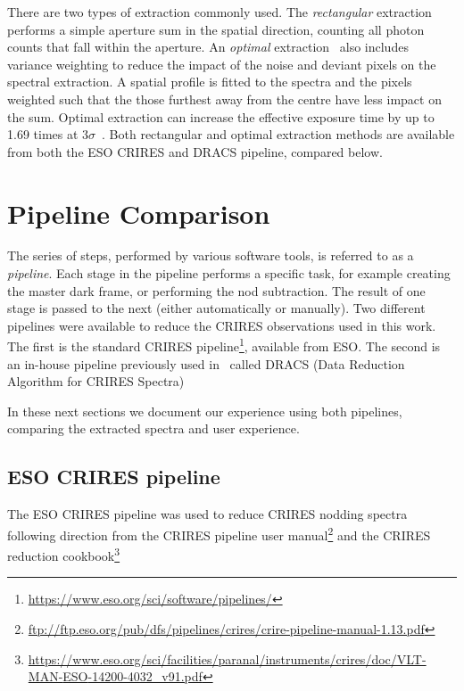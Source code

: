 There are two types of extraction commonly used. The \emph{rectangular} extraction performs a simple aperture sum in the spatial direction, counting all photon counts that fall within the aperture. An \emph{optimal} extraction~\citep{horne_optimal_1986} also includes variance weighting to reduce the impact of the noise and deviant pixels on the spectral extraction. A spatial profile is fitted to the spectra and the pixels weighted such that the those furthest away from the centre have less impact on the sum. Optimal extraction can increase the effective exposure time by up to 1.69 times at \(3 \sigma\)~\citep{horne_optimal_1986}. Both rectangular and optimal extraction methods are available from both the {ESO} {CRIRES} and {DRACS} pipeline, compared below.

\section{Pipeline Comparison}
\label{sec:pipelines}
 The series of steps, performed by various software tools, is referred to as a \emph{pipeline}. Each stage in the pipeline performs a specific task, for example creating the master dark frame, or performing the nod subtraction. The result of one stage is passed to the next (either automatically or manually). Two different pipelines were available to reduce the {CRIRES} observations used in this work. The first is the standard {CRIRES} pipeline\footnote{\href{https://www.eso.org/sci/software/pipelines/}{https://www.eso.org/sci/software/pipelines/}}, available from {ESO}.
The second is an in-house pipeline previously used in~\citet{figueira_radial_2010} called {DRACS} (Data Reduction Algorithm for {CRIRES} Spectra) 

In these next sections we document our experience using both pipelines, comparing the extracted spectra and user experience.


\subsection{{ESO} {CRIRES} pipeline}
\label{subsec:eso-crires}
The {ESO} {CRIRES} pipeline was used to reduce {CRIRES} nodding spectra following direction from the {CRIRES} pipeline user manual\footnote{\href{ftp://ftp.eso.org/pub/dfs/pipelines/crires/crire-pipeline-manual-1.13.pdf}{ftp://ftp.eso.org/pub/dfs/pipelines/crires/crire-pipeline-manual-1.13.pdf}} and the {CRIRES} reduction cookbook\footnote{\href{https://www.eso.org/sci/facilities/paranal/instruments/crires/doc/VLT-MAN-{ESO}-14200-4032\_v91.pdf}{https://www.eso.org/sci/facilities/paranal/instruments/crires/doc/VLT-MAN-{ESO}-14200-4032\_v91.pdf}}

